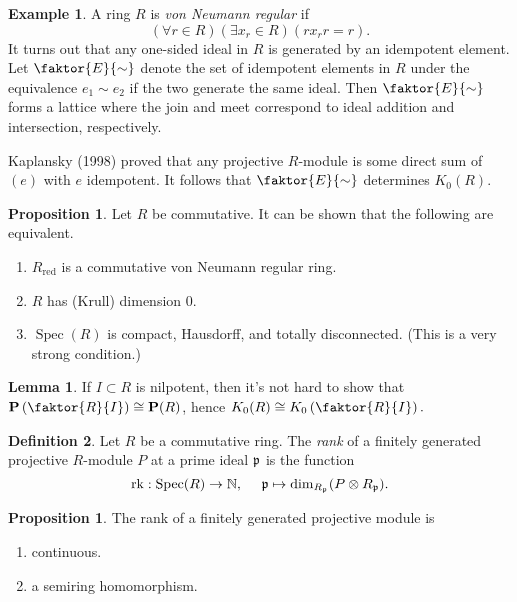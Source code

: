 \documentclass[10pt,letterpaper,cm]{nupset}
\theoremstyle{definition}
\newtheorem{definition}{Definition}
\newtheorem{exmp}[definition]{Example}
\theoremstyle{theorem}
\newtheorem{lemma}[theorem]{Lemma}
\newtheorem{prop}[theorem]{Proposition}
\theoremstyle{remark}
\newcommand{\N}{\mathbb N}
\renewcommand{\P}{\mathbf P}
\newcommand{\1}{\mathbf{1}}
\newcommand{\0}{\vec 0}
\DeclareMathOperator{\red}{red}
\DeclareMathOperator{\spec}{Spec}
\DeclareMathOperator{\rk}{rk}
\begin{document}
\begin{exmp}
A ring $R$ is \textit{von Neumann regular} if $$(\forall r \in R)(\exists x_r\in R)(rx_rr=r).$$ It turns out that any one-sided ideal in $R$ is generated by an idempotent element. Let $\faktor{E}{\sim}$ denote the set of idempotent elements in $R$ under the equivalence $e_1 \sim e_2$ if the two generate the same ideal. Then  $\faktor{E}{\sim}$  forms a lattice where the join and meet correspond to ideal addition and intersection, respectively.

\medskip

 Kaplansky (1998) proved that any projective $R$-module is some direct sum of $(e)$ with $e$ idempotent. It follows that $\faktor{E}{\sim}$ determines $K_0(R)$.
\end{exmp}

\begin{prop}\label{Krull}
Let $R$ be commutative. It can be shown that the following are equivalent.
\begin{enumerate}
\item $R_{\red}$ is a commutative von Neumann regular ring.
\item $R$ has (Krull) dimension $0$.
\item $\spec(R)$ is compact, Hausdorff, and totally disconnected. (This is a very strong condition.)
\end{enumerate}
\end{prop}

\begin{lemma}\label{L5}
If $I\subset R$ is nilpotent, then it's not hard to show that $\P\left(\faktor{R}{I}\right) \cong \P(R)$, hence $K_0(R) \cong K_0\left(\faktor{R}{I}\right).$
\end{lemma}

\begin{definition}
Let $R$ be a commutative ring. The \textit{rank} of a finitely generated projective $R$-module $P$ at a prime ideal $\frak{p}$ is the function $$\rk: \spec(R) \to \N,\  \quad \frak{p} \mapsto \dim_{R_{\frak{p}}} (P \otimes R_{\frak{p}}).$$
\end{definition}
\begin{prop} The rank of a finitely generated projective module is
\begin{enumerate}
\item continuous.
\item a semiring homomorphism.
\end{enumerate}
\end{prop}
\end{document}
